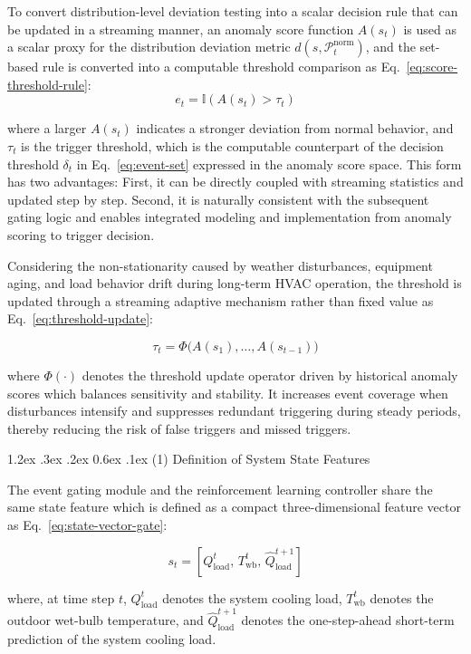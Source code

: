 ﻿\documentclass[preprint,12pt,number]{elsarticle}
\makeatletter
\renewcommand\paragraph{\@startsection{paragraph}{4}{\z@}%
  {1.2ex \@plus .3ex \@minus .2ex}%
  {0.6ex \@plus .1ex}%
  {\normalfont\normalsize}}
\makeatother
\begin{document}
To convert distribution-level deviation testing into a scalar decision rule that can be updated in a streaming manner, an anomaly score function \(A(s_t)\) is used as a scalar proxy for the distribution deviation metric \(d(s,\mathcal{P}^{\text{norm}}_t)\), and the set-based rule is converted into a computable threshold comparison as Eq.~\eqref{eq:score-threshold-rule}: \[
e_t=\mathbb{I}(A(s_t)>\tau_t) \tag{2}\label{eq:score-threshold-rule}
\]

\noindent where a larger \(A(s_t)\) indicates a stronger deviation from normal behavior, and \(\tau_t\) is the trigger threshold, which is the computable counterpart of the decision threshold \(\delta_t\) in Eq.~\eqref{eq:event-set} expressed in the anomaly score space. This form has two advantages: First, it can be directly coupled with streaming statistics and updated step by step. Second, it is naturally consistent with the subsequent gating logic and enables integrated modeling and implementation from anomaly scoring to trigger decision.

Considering the non-stationarity caused by weather disturbances, equipment aging, and load behavior drift during long-term HVAC operation, the threshold is updated through a streaming adaptive mechanism rather than fixed value as Eq.~\eqref{eq:threshold-update}:

\[
    \tau_t=\Phi\big(A(s_{1}),\ldots,A(s_{t-1})\big) \tag{3}\label{eq:threshold-update}
\]

\noindent where \(\Phi(\cdot)\) denotes the threshold update operator driven by historical anomaly scores which balances sensitivity and stability. It increases event coverage when disturbances intensify and suppresses redundant triggering during steady periods, thereby reducing the risk of false triggers and missed triggers.

\paragraph{(1) Definition of System State Features}\label{definition-of-system-state-features}

The event gating module and the reinforcement learning controller share the same state feature which is defined as a compact three-dimensional feature vector as Eq.~\eqref{eq:state-vector-gate}:

\[s_t=[Q_{\mathrm{load}}^t,\,T_{\mathrm{wb}}^t,\,\hat{Q}_{\mathrm{load}}^{t+1}] \tag{4}\label{eq:state-vector-gate}\]

\noindent where, at time step \(t\), \(Q_{\mathrm{load}}^t\) denotes the system cooling load, \(T_{\mathrm{wb}}^t\) denotes the outdoor wet-bulb temperature, and \(\hat{Q}_{\mathrm{load}}^{t+1}\) denotes the one-step-ahead short-term prediction of the system cooling load.
\end{document}

